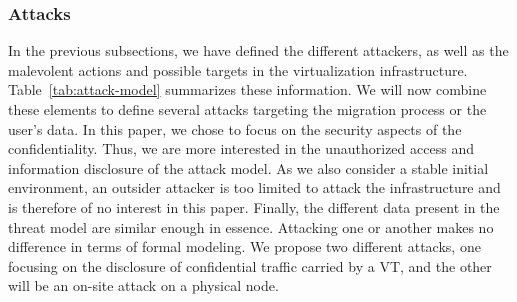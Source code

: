 \subsubsection{Attacks}
\label{sec:attacks}
In the previous subsections, we have defined the different attackers, as well as the malevolent actions and possible targets in the virtualization infrastructure. 
Table~\ref{tab:attack-model} summarizes these information.
We will now combine these elements to define several attacks targeting the migration process or the user's data.
In this paper, we chose to focus on the security aspects of the confidentiality.
Thus, we are more interested in the unauthorized access and information disclosure of the attack model.
As we also consider a stable initial environment, an outsider attacker is too limited to attack the infrastructure and is therefore of no interest in this paper.
Finally, the different data present in the threat model are similar enough in essence.
Attacking one or another makes no difference in terms of formal modeling.
We propose two different attacks, one focusing on the disclosure of confidential traffic carried by a VT, and the other will be an on-site attack on a physical node.


